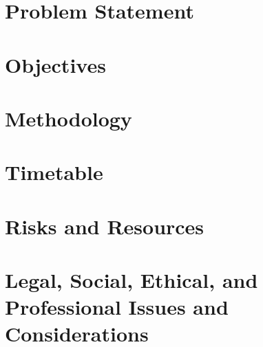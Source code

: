 \documentclass[a4paper,fleqn,10pt]{article}
\begin{document}


\pagestyle{plain}

\section{Problem Statement}


\section{Objectives}


\section{Methodology}


\section{Timetable}


\section{Risks and Resources}


\section{Legal, Social, Ethical, and Professional Issues and Considerations}


% 


\end{document}
